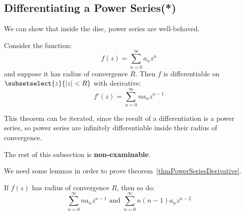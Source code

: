\documentclass[../Main.tex]{subfiles}
\begin{document}
\subsection{Differentiating a Power Series(*)}
We can show that inside the disc, power series are well-behaved.
\begin{theorem}
    Consider the function:
    \begin{equation*}
        f(z) = \sum_{n = 0}^\infty a_n z^n
    \end{equation*}
    and suppose it has radius of convergence $R$. Then $f$ is differentiable on $\subsetselect{z}{|z| < R}$ with derivative:
    \begin{equation*}
        f'(z) = \sum_{n = 0}^\infty n a_n z^{n-1}
    \end{equation*}
    \label{thmPowerSeriesDerivative}
\end{theorem}
\begin{remark}
    This theorem can be iterated, since the result of a differentiation is a power series, so power series are infinitely differentiable inside their radius of convergence.
\end{remark}
The rest of this subsection is \textbf{non-examinable}.\par
We need some lemmas in order to prove theorem~\ref{thmPowerSeriesDerivative}.
\begin{lemma}
    If $f(z)$ has radius of convergence $R$, then so do:
    \begin{equation*}
        \sum_{n = 0}^\infty n a_n z^{n-1} \text{ and } \sum_{n = 0}^\infty n(n-1) a_n z^{n-2}
    \end{equation*}
    \label{lemPowerSeriesDerivativesConverge}
\end{lemma}
\end{document}
